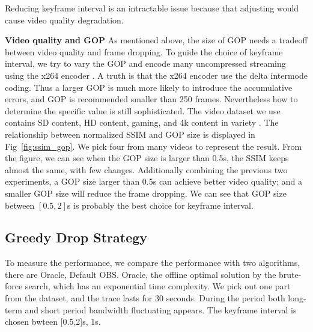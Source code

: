 Reducing keyframe interval is an intractable issue because that adjusting would cause video quality degradation.

\textbf{Video quality and GOP} As mentioned above, the size of GOP needs a tradeoff between video quality and frame dropping. To guide the choice of keyframe interval, we try to vary the GOP and encode many uncompressed streaming using the x264 encoder \cite{x264}. A truth is that the x264 encoder use the delta intermode coding. Thus a larger GOP is much more likely to introduce the accumulative errors, and GOP is recommended smaller than 250 frames. Nevertheless how to determine the specific value is still sophisticated. The video dataset we use contains SD content, HD content, gaming, and 4k content in variety \cite{video_dataset}. The relationship between normalized SSIM and GOP size is displayed in Fig~\ref{fig:ssim_gop}.
We pick four from many videos to represent the result. From the figure, we can see when the GOP size is larger than 0.5s, the SSIM keeps almost the same, with few changes. Additionally combining the previous two experiments, a GOP size larger than 0.5s can achieve better video quality; and a smaller GOP size will reduce the frame dropping. We can see that GOP size between $[0.5,2]$s is probably the best choice for keyframe interval.

\iffalse

\textbf{Varying bitrate.}
To make the conclusion more visible, we fix keyframe interval to be 8s and introduce network interruption between 19s and 21s. In different experiments, we provide sufficient network bandwidth and vary the bitrate to be 1000kbps, 1500kbps, 2000kbps, and 2500kbps. The frame drop is shown in Table~\ref{tab:bitrate}. The different bitrates do not make much difference, the number of drop in all cases is about 149.

\textbf{Summary.} We summarize and get conclusions. First, reducing keyframe interval leads to less frame drop. Second, bitrate does not influence frame drop for the short-term case, but the quality of each picture. Preliminary Evaluation points out that a small GOP is one useful try.
\fi

\vspace{-0.05in}
\subsection{Greedy Drop Strategy}
To measure the performance, we compare the performance with two algorithms, there are Oracle, Default OBS. Oracle, the offline optimal solution by the brute-force search, which has an exponential time complexity. We pick out one part from the dataset, and the trace lasts for $30$ seconds. During the period both long-term and short period bandwidth fluctuating appears. The keyframe interval is chosen bwteen [0.5,2]s, 1s.


